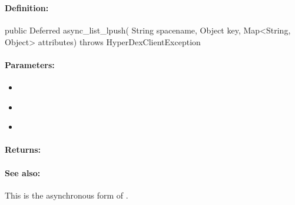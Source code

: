 \pagebreak
\subsubsection{}
\label{api:java:async_list_lpush}


\paragraph{Definition:}
\begin{javacode}
public Deferred async_list_lpush(
        String spacename,
        Object key,
        Map<String, Object> attributes) throws HyperDexClientException
\end{javacode}

\paragraph{Parameters:}
\begin{itemize}[noitemsep]
\item {}\\

\item {}\\

\item {}\\

\end{itemize}

\paragraph{Returns:}


\paragraph{See also:}  This is the asynchronous form of .

\pagebreak
\subsubsection{}
\label{api:java:uxact_list_lpush}


